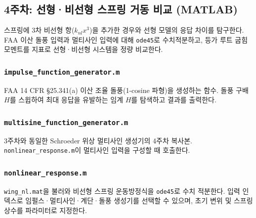 \documentclass[
	a4paper, %
	10pt, %
]{CSUniSchoolLabReport}
\begin{document}


\subsection{4주차: 선형·비선형 스프링 거동 비교 (MATLAB)}
스프링에 3차 비선형 항(\(k_{nl}x^3\))을 추가한 경우와 선형 모델의 응답 차이를 탐구한다.
FAA 이산 돌풍 입력과 멀티사인 입력에 대해 \texttt{ode45}로 수치적분하고,
등가 루트 굽힘 모멘트를 지표로 선형·비선형 시스템을 정량 비교한다.

\subsubsection{\texttt{impulse\_function\_generator.m}}
FAA 14 CFR \S25.341(a) 이산 조율 돌풍(1-cosine 파형)을 생성하는 함수.
돌풍 구배 \(H\)를 스윕하여 최대 응답을 유발하는 임계 \(H\)를 탐색하고 결과를 출력한다.



\subsubsection{\texttt{multisine\_function\_generator.m}}
3주차와 동일한 Schroeder 위상 멀티사인 생성기의 4주차 복사본.
\texttt{nonlinear\_response.m}이 멀티사인 입력을 구성할 때 호출한다.



\subsubsection{\texttt{nonlinear\_response.m}}
\texttt{wing\_nl.mat}을 불러와 비선형 스프링 운동방정식을 \texttt{ode45}로 수치 적분한다.
입력 인덱스로 임펄스·멀티사인·계단·돌풍 생성기를 선택할 수 있으며,
초기 변위 및 스프링 상수를 파라미터로 지정한다.


\end{document}
